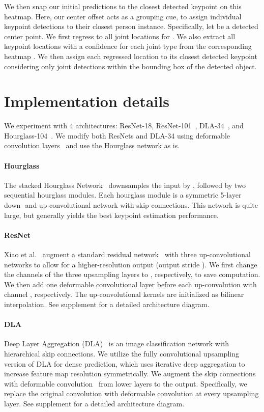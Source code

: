 \documentclass[10pt,twocolumn,letterpaper]{article}
\begin{document}
We then snap our initial predictions to the closest detected keypoint on this heatmap.
Here, our center offset acts as a grouping cue, to assign individual keypoint detections to their closest person instance. 
Specifically, let  be a detected center point.
We first regress to all joint locations  for .
We also extract all keypoint locations  with a confidence  for each joint type  from the corresponding heatmap .
We then assign each regressed location  to its closest detected keypoint  considering only joint detections within the bounding box of the detected object.


\section{Implementation details}

We experiment with 4 architectures: ResNet-18, ResNet-101~\cite{xiao2018simple}, DLA-34~\cite{yu2018deep}, and Hourglass-104~\cite{Law_2018_ECCV}.
We modify both ResNets and DLA-34 using deformable convolution layers~\cite{Dai_2017_ICCV} and use the Hourglass network as is.

\label{sec:networks}
\paragraph{Hourglass}
The stacked Hourglass Network~\cite{newell2016stacked,Law_2018_ECCV} downsamples the input by ,  followed by two sequential hourglass modules.
Each hourglass module is a symmetric 5-layer down- and up-convolutional network with skip connections.
This network is quite large, but generally yields the best keypoint estimation performance.

\paragraph{ResNet}
Xiao et al.~\cite{xiao2018simple} augment a standard residual network~\cite{he2016deep} with three up-convolutional networks to allow for a higher-resolution output (output stride ).
We first change the channels of the three upsampling layers to , respectively, to save computation.
We then add one  deformable convolutional layer before each up-convolution with channel , respectively.
The up-convolutional kernels are initialized as bilinear interpolation.
See supplement for a detailed architecture diagram.

\paragraph{DLA}
Deep Layer Aggregation (DLA)~\cite{yu2018deep} is an image classification network with hierarchical skip connections.
We utilize the fully convolutional upsampling version of DLA for dense prediction, 
which uses iterative deep aggregation to increase feature map resolution symmetrically. 
We augment the skip connections with deformable convolution~\cite{zhu2018deformable} from lower layers to the output.
Specifically, we replace the original convolution with  deformable convolution at every upsampling layer.
See supplement for a detailed architecture diagram.
\end{document}
